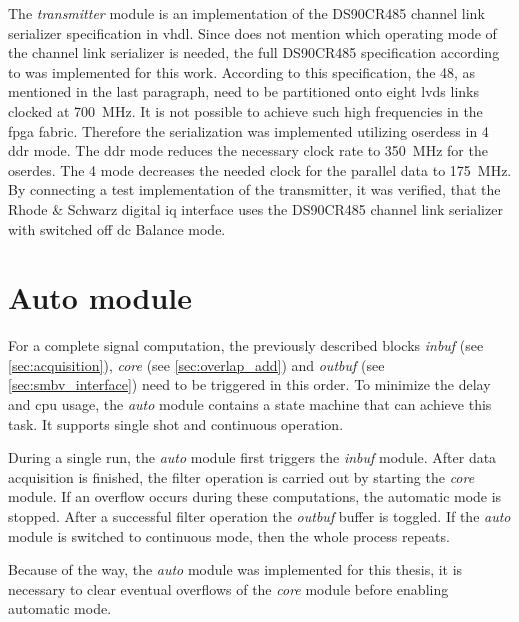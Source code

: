 \documentclass[12pt,a4paper,parskip=full,abstract=true,BCOR=12mm,twoside,open=right]{scrreprt}
\def\device#1{\textit{#1}}
\begin{document}
The \device{transmitter} module is an implementation of the DS90CR485 channel
link serializer specification in \gls{vhdl}. Since \cite{fsq_b17} does not
mention which operating mode of the channel link serializer is needed, the
full DS90CR485 specification according to \cite{ds90cr485} was implemented for this work.
According to this specification, the \SI{48}{\bit}, as mentioned in the last
paragraph, need to be partitioned onto eight \gls{lvds} links clocked at
\SI{700}{\mega\hertz}. It is not possible to achieve such high frequencies
in the \gls{fpga} fabric. Therefore the serialization was implemented utilizing
\glspl{oserdes} in \SI{4}{\bit} \gls{ddr} mode. The \gls{ddr} mode reduces the
necessary clock rate to \SI{350}{\mega\hertz} for the \gls{oserdes}. The
\SI{4}{\bit} mode decreases the needed clock for the parallel data to
\SI{175}{\mega\hertz}. By connecting a test implementation of the transmitter,
it was verified, that the Rhode \& Schwarz digital \gls{iq} interface uses the
DS90CR485 channel link serializer with switched off \gls{dc} Balance mode.


\section{Auto module}
\label{sec:auto}

For a complete signal computation, the previously described blocks
\device{inbuf} (see \cref{sec:acquisition}), \device{core} (see
\cref{sec:overlap_add}) and \device{outbuf} (see \cref{sec:smbv_interface})
need to be triggered in this order. To minimize the delay and \gls{cpu}
usage, the \device{auto} module contains a state machine that can achieve
this task. It supports single shot and continuous operation.

During a single run, the \device{auto} module first triggers the \device{inbuf}
module. After data acquisition is finished, the filter operation is carried out
by starting the \device{core} module. If an overflow occurs during these
computations, the automatic mode is stopped. After a successful filter
operation the \device{outbuf} buffer is toggled. If the \device{auto} module
is switched to continuous mode, then the whole process repeats.

Because of the way, the \device{auto} module was implemented for this thesis,
it is necessary to clear eventual overflows of the \device{core} module before
enabling automatic mode.
\end{document}
